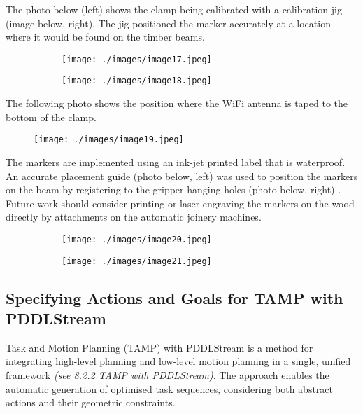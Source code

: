 The photo below (left) shows the clamp being calibrated with a calibration jig (image below, right). The jig positioned the marker accurately at a location where it would be found on the timber beams.

\begin{figure}[H]
\centering
\begin{subfigure}[b]{0.45\textwidth}
\centering
\texttt{[image: ./images/image17.jpeg]}
\end{subfigure}
\hfill
\begin{subfigure}[b]{0.45\textwidth}
\centering
\texttt{[image: ./images/image18.jpeg]}
\end{subfigure}
\end{figure}


The following photo shows the position where the WiFi antenna is taped to the bottom of the clamp.

\begin{figure}[H]
\texttt{[image: ./images/image19.jpeg]}
\end{figure}


The markers are implemented using an ink-jet printed label that is waterproof. An accurate placement guide (photo below, left) was used to position the markers on the beam by registering to the gripper hanging holes (photo below, right) . Future work should consider printing or laser engraving the markers on the wood directly by attachments on the automatic joinery machines.

\begin{figure}[H]
\centering
\begin{subfigure}[b]{0.45\textwidth}
\centering
\texttt{[image: ./images/image20.jpeg]}
\end{subfigure}
\hfill
\begin{subfigure}[b]{0.45\textwidth}
\centering
\texttt{[image: ./images/image21.jpeg]}
\end{subfigure}
\end{figure}


\subsection{Specifying Actions and Goals for TAMP with PDDLStream}

Task and Motion Planning (TAMP) with PDDLStream is a method for integrating high-level planning and low-level motion planning in a single, unified framework \textit{(see \uline{8.2.2 TAMP with PDDLStream})}. The approach enables the automatic generation of optimised task sequences, considering both abstract actions and their geometric constraints. 

